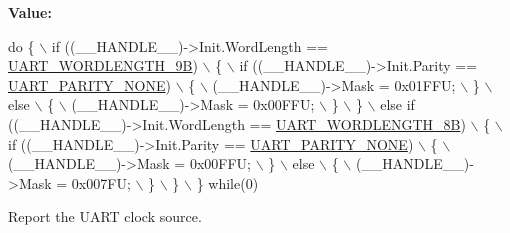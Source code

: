 {\bfseries Value\+:}
\begin{DoxyCode}
\textcolor{keywordflow}{do} \{                                                                \(\backslash\)
  if ((\_\_HANDLE\_\_)->Init.WordLength == \hyperlink{group___u_a_r_t_ex___word___length_gaf867be43de35fd3c32fe0b4dd4058f7e}{UART\_WORDLENGTH\_9B})            \(\backslash\)
  \{                                                                   \(\backslash\)
     if ((\_\_HANDLE\_\_)->Init.Parity == \hyperlink{group___u_a_r_t___parity_ga270dea6e1a92dd83fe58802450bdd60c}{UART\_PARITY\_NONE})               \(\backslash\)
     \{                                                                \(\backslash\)
        (\_\_HANDLE\_\_)->Mask = 0x01FFU;                                 \(\backslash\)
     \}                                                                \(\backslash\)
     else                                                             \(\backslash\)
     \{                                                                \(\backslash\)
        (\_\_HANDLE\_\_)->Mask = 0x00FFU;                                 \(\backslash\)
     \}                                                                \(\backslash\)
  \}                                                                   \(\backslash\)
  else \textcolor{keywordflow}{if} ((\_\_HANDLE\_\_)->Init.WordLength == \hyperlink{group___u_a_r_t_ex___word___length_gaf394e9abaf17932ee89591f990fe6407}{UART\_WORDLENGTH\_8B})       \(\backslash\)
  \{                                                                   \(\backslash\)
     if ((\_\_HANDLE\_\_)->Init.Parity == \hyperlink{group___u_a_r_t___parity_ga270dea6e1a92dd83fe58802450bdd60c}{UART\_PARITY\_NONE})               \(\backslash\)
     \{                                                                \(\backslash\)
        (\_\_HANDLE\_\_)->Mask = 0x00FFU;                                 \(\backslash\)
     \}                                                                \(\backslash\)
     else                                                             \(\backslash\)
     \{                                                                \(\backslash\)
        (\_\_HANDLE\_\_)->Mask = 0x007FU;                                 \(\backslash\)
     \}                                                                \(\backslash\)
  \}                                                                   \(\backslash\)
\} \textcolor{keywordflow}{while}(0)
\end{DoxyCode}


Report the U\+A\+RT clock source. 


